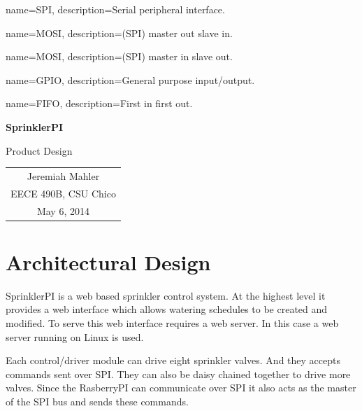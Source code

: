 \documentclass{article}
\begin{document}

{
	name={SPI},
	description={Serial peripheral interface}.
}

{
	name={MOSI},
	description={(SPI) master out slave in}.
}

{
	name={MOSI},
	description={(SPI) master in slave out}.
}

{
	name={GPIO},
	description={General purpose input/output}.
}

{
	name={FIFO},
	description={First in first out}.
}


\vspace*{1.0in}

\centerline{\LARGE \textbf{SprinklerPI}}
\vspace{0.3in}
\centerline{\LARGE Product Design}

\vfill

\begin{center}
\begin{tabular}{c}
Jeremiah Mahler \\
EECE 490B, CSU Chico \\
May 6, 2014
\end{tabular}
\end{center}

\vspace{2in}

\thispagestyle{empty}

\pagebreak

\nocite{rasberrypi}
\thispagestyle{empty}
\tableofcontents

\clearpage
\section{Architectural Design}

SprinklerPI is a web based sprinkler control system.
At the highest level it provides a web interface
which allows watering schedules to be created and modified.
To serve this web interface requires a web server.
In this case a web server running on Linux is used.

Each control/driver module can drive eight sprinkler valves.
And they accepts commands sent over SPI.
They can also be daisy chained together to drive more valves.
Since the RasberryPI can communicate over SPI it also
acts as the master of the SPI bus and sends these commands.
\end{document}
